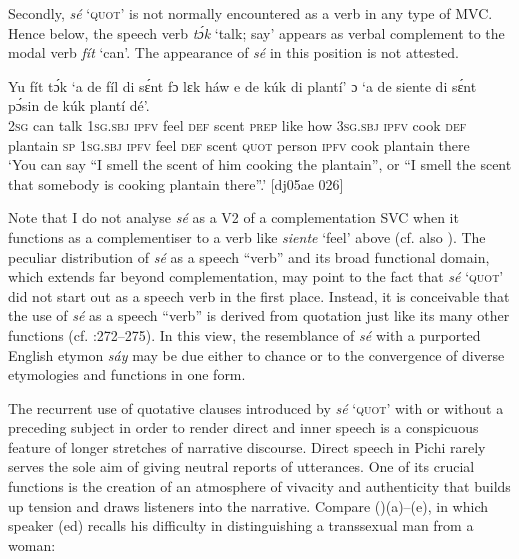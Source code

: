 Secondly, \textit{sé} ‘\textsc{quot}’ is not normally encountered as a verb in any type of MVC. Hence below, the speech verb \textit{tɔ́k} ‘talk; say’ appears as verbal complement to the modal verb \textit{fít} ‘can’. The appearance of \textit{sé} in this position is not attested. 


\ea%
    \label{ex:key:1370}
    \gll Yu  fít  tɔ́k  ‘a    de  fíl  di  sɛ́nt    fɔ  lɛk  háw 
e    de  kúk    di  plantí’  ɔ  ‘a    de  siente  di  sɛ́nt
   pɔ́sin  de  kúk    plantí  dé’.\\
\textsc{2sg}  can  talk  \textsc{1sg.sbj}  \textsc{ipfv}  feel  \textsc{def}  scent  \textsc{prep}  like  how
\textsc{3sg.sbj}  \textsc{ipfv}  cook  \textsc{def}  plantain  \textsc{sp}  \textsc{1sg.sbj}  \textsc{ipfv}  feel    \textsc{def}  scent
\textsc{quot}    person  \textsc{ipfv}  cook  plantain  there\\

\glt ‘You can say “I smell the scent of him cooking the plantain”, or “I smell 
the scent that somebody is cooking plantain there”.’ [dj05ae 026]
\z

Note that I do not analyse \textit{sé} as a V2 of a complementation SVC when it functions as a complementiser to a verb like \textit{siente} ‘feel’ above (cf. also ). The peculiar distribution of \textit{sé} as a speech “verb” and its broad functional domain, which extends far beyond complementation, may point to the fact that \textit{sé} ‘\textsc{quot’} did not start out as a speech verb in the first place. Instead, it is conceivable that the use of \textit{sé} as a speech “verb” is derived from quotation just like its many other functions (cf. \citealt{Güldemann2008}:272–275). In this view, the resemblance of \textit{sé} with a purported English etymon \textit{sáy} may be due either to chance or to the convergence of diverse etymologies and functions in one form.


The recurrent use of quotative clauses introduced by \textit{sé} ‘\textsc{quot}’ with or without a preceding subject in order to render direct and inner speech is a conspicuous feature of longer stretches of narrative discourse. Direct speech in Pichi rarely serves the sole aim of giving neutral reports of utterances. One of its crucial functions is the creation of an atmosphere of vivacity and authenticity that builds up tension and draws listeners into the narrative. Compare ()(a)–(e), in which speaker (ed) recalls his difficulty in distinguishing a transsexual man from a woman: 



